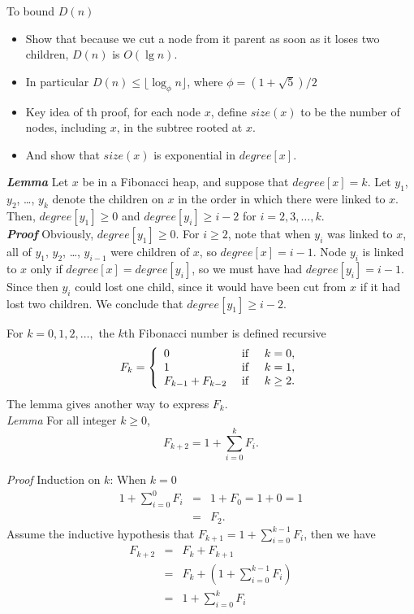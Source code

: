 \documentclass{beamer}
\begin{document}
\begin{frame}{}
\centerline{\large To bound $D(n)$}
\begin{itemize}
\item Show that because we cut a node from it parent as soon as it loses two children, $D(n)$ is $O(\lg n)$. 
\item In particular $D(n)\le \lfloor \log_{\phi}n\rfloor $, where $\phi=(1+\sqrt{5})/2$
\item Key idea of th proof, for each node $x$, define $size(x)$ to be the number of nodes, including $x$,
 in the subtree rooted at $x$. 
\item And show that $size(x)$ is exponential in $degree[x]$.
\end{itemize}
\end{frame}

\begin{frame}{}
{\bf\it Lemma} Let $x$ be in a Fibonacci heap, and suppose that $degree[x]=k$. Let
$y_1$, $y_2$, \ldots, $y_k$ denote the children on $x$ in the order in which there were linked to $x$.
Then, $degree[y_1]\ge 0$ and $degree[y_i]\ge i-2$ for $i=2, 3, \ldots, k$. \\
{\bf\it Proof} Obviously, $degree[y_1]\ge 0$. For $i\ge 2$, note that when $y_i$ was linked to $x$, all of
$y_1$, $y_2$, \ldots, $y_{i-1}$ were children of $x$, so $degree[x]=i-1$. Node $y_i$ is linked to $x$
only if $degree[x]=degree[y_i]$, so we must have had $degree[y_i]=i-1$. Since then $y_i$ could lost
one child, since it would have been cut from $x$ if it had lost two children. We conclude that $degree[y_1]\ge i-2$. 
\end{frame}

\begin{frame}{}
For $k=0,1,2,\ldots, $ the $k$th Fibonacci number is defined recursive
$$F_k=\left\{
\begin{array}{lll}
0 & {\rm \ if\ } & k=0, \\
1 & {\rm \ if\ } & k=1, \\
F_{k-1}+F_{k-2} & {\rm \ if\ } & k\ge 2. 
\end{array}
 \right.$$
The lemma gives another way to express $F_k$. \\
{\it Lemma } For all integer $k\ge 0$, $$F_{k+2}=1+\sum^k_{i=0}F_i. $$
\end{frame}

\begin{frame}{}
{\it Proof} Induction on $k$: When $k=0$
\begin{eqnarray}
1+\sum^0_{i=0}F_i &=& 1+F_0    = 1+0   =  1 \nonumber \\
   &=& F_2. \nonumber
\end{eqnarray} 
Assume the inductive hypothesis that $F_{k+1}=1+\sum^{k-1}_{i=0}F_i$, then we have
\begin{eqnarray}
F_{k+2} &=& F_k+F_{k+1} \nonumber \\
  &=& F_k + (1+\sum_{i=0}^{k-1}F_i) \nonumber \\
  &=& 1 + \sum^{k}_{i=0}F_i \nonumber
\end{eqnarray}
\end{frame}
\end{document}
